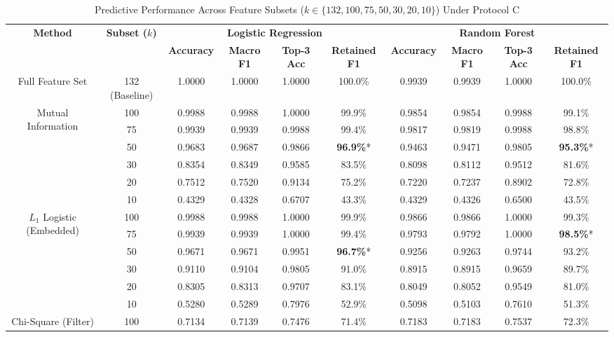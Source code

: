 \begin{table}[!t]
\caption{Predictive Performance Across Feature Subsets ($k \in \{132, 100, 75, 50, 30, 20, 10\}$) Under Protocol C}
\label{tab:feature_selection_summary}
\centering
\begin{tabular}{cc|cccc|cccc}
\toprule
\multirow{2}{*}{\textbf{Method}} & \multirow{2}{*}{\textbf{Subset ($k$)}} & \multicolumn{4}{c|}{\textbf{Logistic Regression}} & \multicolumn{4}{c}{\textbf{Random Forest}} \\
\cmidrule{3-10}
& & \textbf{Accuracy} & \textbf{Macro F1} & \textbf{Top-3 Acc} & \textbf{Retained F1} & \textbf{Accuracy} & \textbf{Macro F1} & \textbf{Top-3 Acc} & \textbf{Retained F1} \\
\midrule
Full Feature Set & 132 (Baseline) & 1.0000 & 1.0000 & 1.0000 & 100.0\% & 0.9939 & 0.9939 & 1.0000 & 100.0\% \\
\midrule
\multirow{6}{*}{Mutual Information} 
& 100 & 0.9988 & 0.9988 & 1.0000 & 99.9\% & 0.9854 & 0.9854 & 0.9988 & 99.1\% \\
& 75  & 0.9939 & 0.9939 & 0.9988 & 99.4\% & 0.9817 & 0.9819 & 0.9988 & 98.8\% \\
& 50  & 0.9683 & 0.9687 & 0.9866 & \textbf{96.9\%}* & 0.9463 & 0.9471 & 0.9805 & \textbf{95.3\%}* \\
& 30  & 0.8354 & 0.8349 & 0.9585 & 83.5\% & 0.8098 & 0.8112 & 0.9512 & 81.6\% \\
& 20  & 0.7512 & 0.7520 & 0.9134 & 75.2\% & 0.7220 & 0.7237 & 0.8902 & 72.8\% \\
& 10  & 0.4329 & 0.4328 & 0.6707 & 43.3\% & 0.4329 & 0.4326 & 0.6500 & 43.5\% \\
\midrule
\multirow{6}{*}{$L_1$ Logistic (Embedded)} 
& 100 & 0.9988 & 0.9988 & 1.0000 & 99.9\% & 0.9866 & 0.9866 & 1.0000 & 99.3\% \\
& 75  & 0.9939 & 0.9939 & 1.0000 & 99.4\% & 0.9793 & 0.9792 & 1.0000 & \textbf{98.5\%}* \\
& 50  & 0.9671 & 0.9671 & 0.9951 & \textbf{96.7\%}* & 0.9256 & 0.9263 & 0.9744 & 93.2\% \\
& 30  & 0.9110 & 0.9104 & 0.9805 & 91.0\% & 0.8915 & 0.8915 & 0.9659 & 89.7\% \\
& 20  & 0.8305 & 0.8313 & 0.9707 & 83.1\% & 0.8049 & 0.8052 & 0.9549 & 81.0\% \\
& 10  & 0.5280 & 0.5289 & 0.7976 & 52.9\% & 0.5098 & 0.5103 & 0.7610 & 51.3\% \\
\midrule
\multirow{6}{*}{Chi-Square (Filter)} 
& 100 & 0.7134 & 0.7139 & 0.7476 & 71.4\% & 0.7183 & 0.7183 & 0.7537 & 72.3\% \\

\end{tabular}
\end{table}
